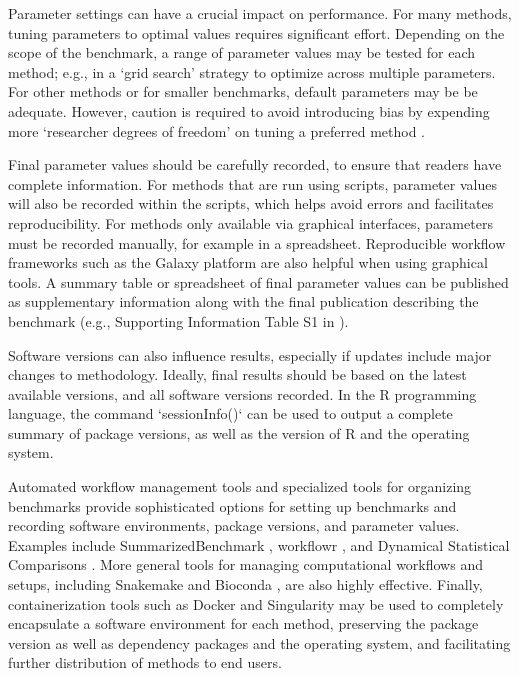 \documentclass[12pt, a4paper]{article}
\begin{document}
Parameter settings can have a crucial impact on performance. For many methods, tuning parameters to optimal values requires significant effort. Depending on the scope of the benchmark, a range of parameter values may be tested for each method; e.g., in a `grid search' strategy to optimize across multiple parameters. For other methods or for smaller benchmarks, default parameters may be be adequate. However, caution is required to avoid introducing bias by expending more `researcher degrees of freedom' on tuning a preferred method \citep{Hu2018b}.

Final parameter values should be carefully recorded, to ensure that readers have complete information. For methods that are run using scripts, parameter values will also be recorded within the scripts, which helps avoid errors and facilitates reproducibility. For methods only available via graphical interfaces, parameters must be recorded manually, for example in a spreadsheet. Reproducible workflow frameworks such as the Galaxy platform \citep{Afgan2018} are also helpful when using graphical tools. A summary table or spreadsheet of final parameter values can be published as supplementary information along with the final publication describing the benchmark (e.g., Supporting Information Table S1 in \citep{Weber2016}).

Software versions can also influence results, especially if updates include major changes to methodology. Ideally, final results should be based on the latest available versions, and all software versions recorded. In the R programming language, the command `sessionInfo()` can be used to output a complete summary of package versions, as well as the version of R and the operating system.

Automated workflow management tools and specialized tools for organizing benchmarks provide sophisticated options for setting up benchmarks and recording software environments, package versions, and parameter values. Examples include SummarizedBenchmark \citep{Kimes2018}, workflowr \citep{Blischak2018}, and Dynamical Statistical Comparisons \citep{Wang2018}. More general tools for managing computational workflows and setups, including Snakemake \citep{Koster2012} and Bioconda \citep{Gruning2018}, are also highly effective. Finally, containerization tools such as Docker and Singularity may be used to completely encapsulate a software environment for each method, preserving the package version as well as dependency packages and the operating system, and facilitating further distribution of methods to end users.
\end{document}
